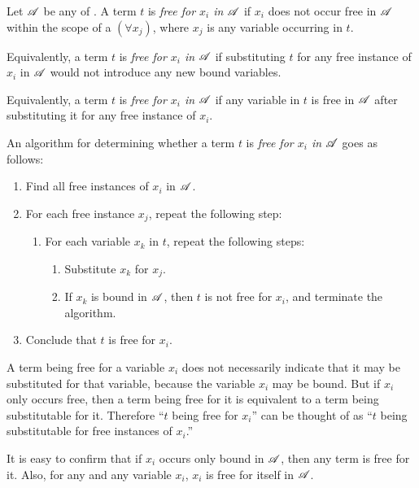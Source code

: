 \setcounter{definition}{10}
\begin{definition}
  Let \(\mathscr{A}\) be any \wf{} of \cl{}. A term \(t\) is \textit{free for \(x_i\) in \(\mathscr{A}\)} if \(x_i\) does not occur free in \(\mathscr{A}\) within the scope of a \((\forall x_j)\), where \(x_j\) is any variable occurring in \(t\).

  Equivalently, a term \(t\) is \textit{free for \(x_i\) in \(\mathscr{A}\)} if substituting \(t\) for any free instance of \(x_i\) in \(\mathscr{A}\) would not introduce any new bound variables.

  Equivalently, a term \(t\) is \textit{free for \(x_i\) in \(\mathscr{A}\)} if any variable in \(t\) is free in \(\mathscr{A}\) after substituting it for any free instance of \(x_i\).

  An algorithm for determining whether a term \(t\) is \textit{free for \(x_i\) in \(\mathscr{A}\)} goes as follows:

  \begin{enumerate}
    \item Find all free instances of \(x_i\) in \(\mathscr{A}\).
    \item For each free instance \(x_j\), repeat the following step:
      \begin{enumerate}
        \item For each variable \(x_k\) in \(t\), repeat the following steps:
        \begin{enumerate}
          \item Substitute \(x_k\) for \(x_j\).
          \item If \(x_k\) is bound in \(\mathscr{A}\), then \(t\) is not free for \(x_i\), and terminate the algorithm.
        \end{enumerate}
      \end{enumerate}
    \item Conclude that \(t\) is free for \(x_i\).
  \end{enumerate}

  \note{} A term being free for a variable \(x_i\) does not necessarily indicate that it may be substituted for that variable, because the variable \(x_i\) may be bound. But if \(x_i\) only occurs free, then a term being free for it is equivalent to a term being substitutable for it. Therefore ``\(t\) being free for \(x_i\)'' can be thought of as ``\(t\) being substitutable for free instances of \(x_i\).''

  \note{} It is easy to confirm that if \(x_i\) occurs only bound in \(\mathscr{A}\), then any term is free for it. Also, for any \wf{} and any variable \(x_i\), \(x_i\) is free for itself in \(\mathscr{A}\).
\end{definition}

